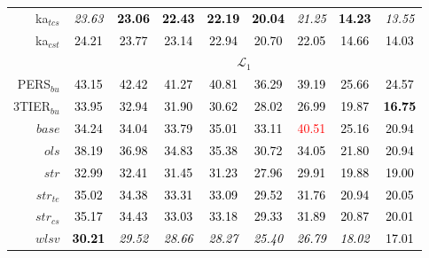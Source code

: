 \begin{tabular}[t]{r|cccccccc}
ka$_{tcs}$ & \textcolor{black}{\em{23.63}} & \textcolor{black}{\textbf{23.06}} & \textcolor{black}{\textbf{22.43}} & \textcolor{black}{\textbf{22.19}} & \textcolor{black}{\textbf{20.04}} & \textcolor{black}{\em{21.25}} & \textcolor{black}{\textbf{14.23}} & \textcolor{black}{\em{13.55}}\\
ka$_{cst}$ & \textcolor{black}{24.21} & \textcolor{black}{23.77} & \textcolor{black}{23.14} & \textcolor{black}{22.94} & \textcolor{black}{20.70} & \textcolor{black}{22.05} & \textcolor{black}{14.66} & \textcolor{black}{14.03}\\
\addlinespace[0.3em]
\multicolumn{1}{c}{} & \multicolumn{8}{c}{$\mathcal{L}_1$}\\
PERS$_{bu}$ & \textcolor{black}{43.15} & \textcolor{black}{42.42} & \textcolor{black}{41.27} & \textcolor{black}{40.81} & \textcolor{black}{36.29} & \textcolor{black}{39.19} & \textcolor{black}{25.66} & \textcolor{black}{24.57}\\
3TIER$_{bu}$ & \textcolor{black}{33.95} & \textcolor{black}{32.94} & \textcolor{black}{31.90} & \textcolor{black}{30.62} & \textcolor{black}{28.02} & \textcolor{black}{26.99} & \textcolor{black}{19.87} & \textcolor{black}{\textbf{16.75}}\\
$base$ & \textcolor{black}{34.24} & \textcolor{black}{34.04} & \textcolor{black}{33.79} & \textcolor{black}{35.01} & \textcolor{black}{33.11} & \textcolor{red}{40.51} & \textcolor{black}{25.16} & \textcolor{black}{20.94}\\
$ols$ & \textcolor{black}{38.19} & \textcolor{black}{36.98} & \textcolor{black}{34.83} & \textcolor{black}{35.38} & \textcolor{black}{30.72} & \textcolor{black}{34.05} & \textcolor{black}{21.80} & \textcolor{black}{20.94}\\
$str$ & \textcolor{black}{32.99} & \textcolor{black}{32.41} & \textcolor{black}{31.45} & \textcolor{black}{31.23} & \textcolor{black}{27.96} & \textcolor{black}{29.91} & \textcolor{black}{19.88} & \textcolor{black}{19.00}\\
$str_{te}$ & \textcolor{black}{35.02} & \textcolor{black}{34.38} & \textcolor{black}{33.31} & \textcolor{black}{33.09} & \textcolor{black}{29.52} & \textcolor{black}{31.76} & \textcolor{black}{20.94} & \textcolor{black}{20.05}\\
$str_{cs}$ & \textcolor{black}{35.17} & \textcolor{black}{34.43} & \textcolor{black}{33.03} & \textcolor{black}{33.18} & \textcolor{black}{29.33} & \textcolor{black}{31.89} & \textcolor{black}{20.87} & \textcolor{black}{20.01}\\
$wlsv$ & \textcolor{black}{\textbf{30.21}} & \textcolor{black}{\em{29.52}} & \textcolor{black}{\em{28.66}} & \textcolor{black}{\em{28.27}} & \textcolor{black}{\em{25.40}} & \textcolor{black}{\em{26.79}} & \textcolor{black}{\em{18.02}} & \textcolor{black}{17.01}\\

\end{tabular}
